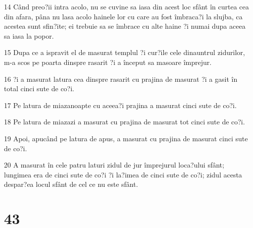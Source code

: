\par 14 Când preo?ii intra acolo, nu se cuvine sa iasa din acest loc sfânt în curtea cea din afara, pâna nu lasa acolo hainele lor cu care au fost îmbraca?i la slujba, ca acestea sunt sfin?ite; ei trebuie sa se îmbrace cu alte haine ?i numai dupa aceea sa iasa la popor.
\par 15 Dupa ce a ispravit el de masurat templul ?i cur?ile cele dinauntrul zidurilor, m-a scos pe poarta dinspre rasarit ?i a început sa masoare împrejur.
\par 16 ?i a masurat latura cea dinspre rasarit cu prajina de masurat ?i a gasit în total cinci sute de co?i.
\par 17 Pe latura de miazanoapte cu aceea?i prajina a masurat cinci sute de co?i.
\par 18 Pe latura de miazazi a masurat cu prajina de masurat tot cinci sute de co?i.
\par 19 Apoi, apucând pe latura de apus, a masurat cu prajina de masurat cinci sute de co?i.
\par 20 A masurat în cele patru laturi zidul de jur împrejurul loca?ului sfânt; lungimea era de cinci sute de co?i ?i la?imea de cinci sute de co?i; zidul acesta despar?ea locul sfânt de cel ce nu este sfânt.

\chapter{43}

